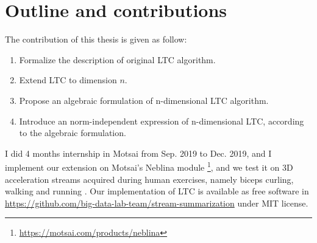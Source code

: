 \section{Outline and contributions}





The contribution of this thesis is given as follow:
\begin{enumerate}
  \item Formalize the description of original LTC algorithm.
  \item Extend LTC to dimension $n$.
  \item Propose an algebraic formulation of n-dimensional LTC algorithm.
  \item Introduce an norm-independent expression of n-dimensional LTC, according
  to the algebraic formulation.
\end{enumerate}


I did 4 months internship in Motsai from Sep. 2019 to Dec. 2019, and I implement
our extension on Motsai's Neblina module
\footnote{\url{https://motsai.com/products/neblina}}, and we test it on 3D
acceleration streams acquired during human exercises, namely biceps curling,
walking and running .
Our implementation of LTC is available as free software in
\url{https://github.com/big-data-lab-team/stream-summarization} under MIT
license.

